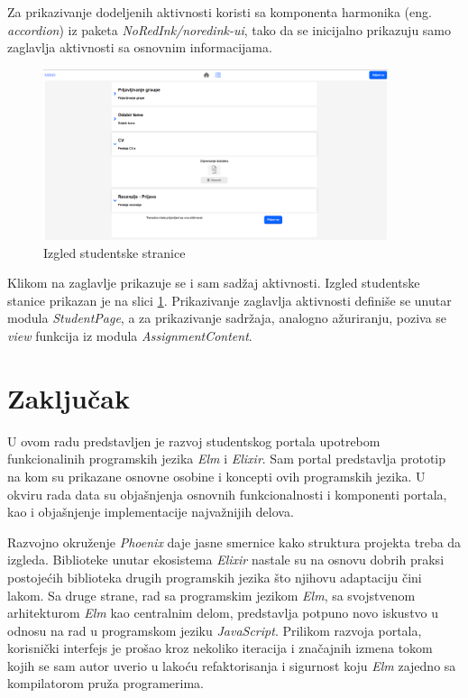 \documentclass[12pt,oneside]{memoir}
\begin{document}
Za prikazivanje dodeljenih aktivnosti koristi sa komponenta harmonika (eng. \emph{accordion}) iz paketa \emph{NoRedInk/noredink-ui},
tako da se inicijalno prikazuju samo zaglavlja aktivnosti sa osnovnim informacijama.
\begin{figure}[!ht]
  \centering
  \includegraphics[width=0.9\textwidth]{student-page.png}
  \caption{Izgled studentske stranice}
  \label{fig:student-page}
\end{figure}
Klikom na zaglavlje prikazuje se i sam sadžaj aktivnosti. Izgled studentske stanice prikazan je na slici \ref{fig:student-page}.
Prikazivanje zaglavlja aktivnosti definiše se unutar modula \emph{StudentPage}, a za prikazivanje sadržaja, analogno ažuriranju,
poziva se \emph{view} funkcija iz modula \emph{AssignmentContent}.

\chapter{Zaključak}
U ovom radu predstavljen je razvoj studentskog portala upotrebom funkcionalinih
programskih jezika \emph{Elm} i \emph{Elixir}. Sam portal predstavlja prototip na
kom su prikazane osnovne osobine i koncepti ovih programskih jezika. U okviru rada
data su objašnjenja osnovnih funkcionalnosti i komponenti portala, kao i
objašnjenje implementacije najvažnijih delova.

Razvojno okruženje \emph{Phoenix} daje jasne smernice kako struktura projekta treba
da izgleda. Biblioteke unutar ekosistema \emph{Elixir} nastale su na osnovu dobrih
praksi postojećih biblioteka drugih programskih jezika što njihovu adaptaciju
čini lakom. Sa druge strane, rad sa programskim jezikom \emph{Elm}, sa svojstvenom arhitekturom \emph{Elm}
kao centralnim delom, predstavlja potpuno novo iskustvo u odnosu na rad
u programskom jeziku \emph{JavaScript}. Prilikom razvoja portala, korisnički interfejs je prošao
kroz nekoliko iteracija i značajnih izmena tokom kojih se sam autor uverio u lakoću
refaktorisanja i sigurnost koju \emph{Elm} zajedno sa kompilatorom pruža programerima.
\end{document}
